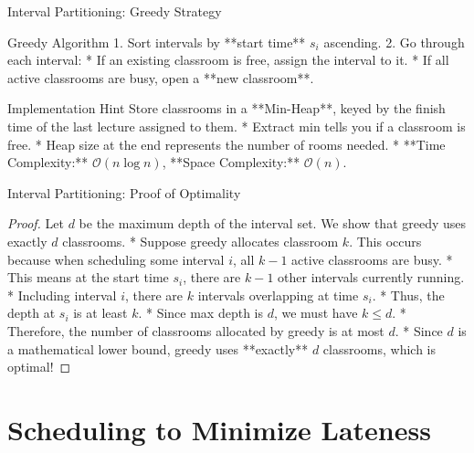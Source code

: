 \documentclass[aspectratio=169,xcolor=dvipsnames]{beamer}
\begin{document}
\begin{frame}{Interval Partitioning: Greedy Strategy}
  \begin{exampleblock}{Greedy Algorithm}
    1. Sort intervals by **start time** $s_i$ ascending.
    2. Go through each interval:
       * If an existing classroom is free, assign the interval to it.
       * If all active classrooms are busy, open a **new classroom**.
  \end{exampleblock}
  \begin{block}{Implementation Hint}
    Store classrooms in a **Min-Heap**, keyed by the finish time of the last lecture assigned to them.
    * Extract min tells you if a classroom is free.
    * Heap size at the end represents the number of rooms needed.
    * **Time Complexity:** $\mathcal{O}(n \log n)$, **Space Complexity:** $\mathcal{O}(n)$.
  \end{block}
\end{frame}

\begin{frame}{Interval Partitioning: Proof of Optimality}
  \begin{proof}
    Let $d$ be the maximum depth of the interval set. We show that greedy uses exactly $d$ classrooms.
    * Suppose greedy allocates classroom $k$. This occurs because when scheduling some interval $i$, all $k-1$ active classrooms are busy.
    * This means at the start time $s_i$, there are $k-1$ other intervals currently running.
    * Including interval $i$, there are $k$ intervals overlapping at time $s_i$.
    * Thus, the depth at $s_i$ is at least $k$.
    * Since max depth is $d$, we must have $k \le d$.
    * Therefore, the number of classrooms allocated by greedy is at most $d$.
    * Since $d$ is a mathematical lower bound, greedy uses **exactly** $d$ classrooms, which is optimal!
  \end{proof}
\end{frame}

\section{Scheduling to Minimize Lateness}
\end{document}
